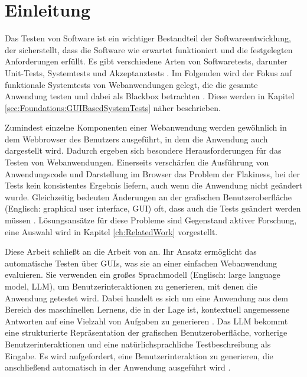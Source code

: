 
\chapter{Einleitung}
\label{ch:Introduction}




Das Testen von Software ist ein wichtiger Bestandteil der Softwareentwicklung, der sicherstellt, dass die Software wie erwartet funktioniert und die festgelegten Anforderungen erfüllt.
Es gibt verschiedene Arten von Softwaretests, darunter Unit-Tests, Systemtests und Akzeptanztests \cite{Sommerville10}.
Im Folgenden wird der Fokus auf funktionale Systemtests von Webanwendungen gelegt, die die gesamte Anwendung testen und dabei als Blackbox betrachten \cite{Beizer1990}.
Diese werden in Kapitel \ref{sec:Foundations:GUIBasedSystemTests} näher beschrieben.


Zumindest einzelne Komponenten einer Webanwendung werden gewöhnlich in dem Webbrowser des Benutzers ausgeführt, in dem die Anwendung auch dargestellt wird.
Dadurch ergeben sich besondere Herausforderungen für das Testen von Webanwendungen.
Einerseits verschärfen die Ausführung von Anwendungscode und Darstellung im Browser das Problem der Flakiness, bei der Tests kein konsistentes Ergebnis liefern, auch wenn die Anwendung nicht geändert wurde.
Gleichzeitig bedeuten Änderungen an der grafischen Benutzeroberfläche (Englisch: graphical user interface, GUI) oft, dass auch die Tests geändert werden müssen \cite{ChallengesSelenium}.
Lösungsansätze für diese Probleme sind Gegenstand aktiver Forschung, eine Auswahl wird in Kapitel \ref{ch:RelatedWork} vorgestellt.


Diese Arbeit schließt an die Arbeit von  an.
Ihr Ansatz ermöglicht das automatische Testen über GUIs, was sie an einer einfachen Webanwendung evaluieren.
Sie verwenden ein großes Sprachmodell (Englisch: large language model, LLM), um Benutzerinteraktionen zu generieren, mit denen die Anwendung getestet wird.
Dabei handelt es sich um eine Anwendung aus dem Bereich des maschinellen Lernens, die in der Lage ist, kontextuell angemessene Antworten auf eine Vielzahl von Aufgaben zu generieren \cite{FewShotLearners}.
Das LLM bekommt eine strukturierte Repräsentation der grafischen Benutzeroberfläche, vorherige Benutzerinteraktionen und eine natürlichsprachliche Testbeschreibung als Eingabe.
Es wird aufgefordert, eine Benutzerinteraktion zu generieren, die anschließend automatisch in der Anwendung ausgeführt wird \cite{GPT3Testing}.


